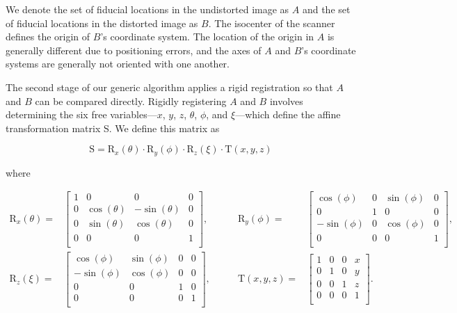 \documentclass[12pt]{article}
\begin{document}
We denote the set of fiducial locations in the undistorted image as $A$ and the set of fiducial locations in the distorted image as $B$.  The isocenter of the scanner defines the origin of $B$'s coordinate system.  The location of the origin in $A$ is generally different due to positioning errors, and the axes of $A$ and $B$'s coordinate systems are generally not oriented with one another.


The second stage of our generic algorithm applies a rigid registration so that $A$ and $B$ can be compared directly.  Rigidly registering $A$ and $B$ involves determining the six free variables---$x$, $y$, $z$, $\theta$, $\phi$, and $\xi$---which define the affine transformation matrix S.  We define this matrix as

$$
\mathrm{S} = \mathrm{R}_x(\theta) \cdot \mathrm{R}_y(\phi) \cdot \mathrm{R}_z(\xi) \cdot \mathrm{T}(x, y, z)
$$

where

$$
\begin{align*}
    \mathrm{R}_x(\theta) =&
    \begin{bmatrix}
        1 & 0 & 0 & 0\\
        0 & \cos(\theta) & -\sin(\theta) & 0\\
        0 & \sin(\theta) & \cos(\theta) & 0\\
        0 & 0 & 0 & 1\\
    \end{bmatrix},&\quad\quad
    \mathrm{R}_y(\phi) =&
    \begin{bmatrix}
        \cos(\phi) & 0 & \sin(\phi) & 0\\
        0 & 1 & 0 & 0\\
        -\sin(\phi) & 0 & \cos(\phi) & 0\\
        0 & 0 & 0 & 1\\
    \end{bmatrix},
    \\
    \mathrm{R}_z(\xi) =&
    \begin{bmatrix}
        \cos(\phi) & \sin(\phi) & 0 & 0\\
        -\sin(\phi) & \cos(\phi) & 0 & 0\\
        0 & 0 & 1 & 0\\
        0 & 0 & 0 & 1\\
    \end{bmatrix},&\quad\quad
    \mathrm{T}(x, y, z) =&
    \begin{bmatrix}
        1 & 0 & 0 & x\\
        0 & 1 & 0 & y\\
        0 & 0 & 1 & z\\
        0 & 0 & 0 & 1\\
    \end{bmatrix}.
\end{align*}
$$
\end{document}
